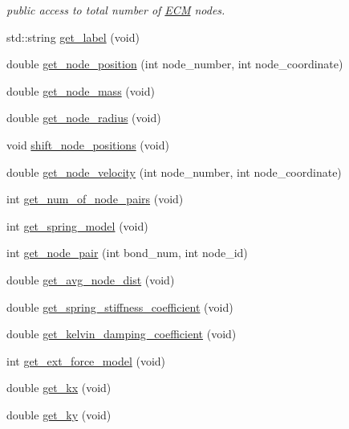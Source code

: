 \begin{DoxyCompactItemize}
\begin{DoxyCompactList}\small\item\em public access to total number of \mbox{\hyperlink{classECM}{E\+CM}} nodes. \end{DoxyCompactList}\item 
std\+::string \mbox{\hyperlink{classActin_aebeb549997f6d414aee3d1661363877e}{get\+\_\+label}} (void)
\item 
double \mbox{\hyperlink{classActin_a833dc614b33e4196ce9202f10e556e36}{get\+\_\+node\+\_\+position}} (int node\+\_\+number, int node\+\_\+coordinate)
\item 
double \mbox{\hyperlink{classActin_a012b67bcc55e02a460dbd4d4b6cd8ea7}{get\+\_\+node\+\_\+mass}} (void)
\item 
double \mbox{\hyperlink{classActin_a4180755ec60e5d39f7399f80270bed1d}{get\+\_\+node\+\_\+radius}} (void)
\item 
void \mbox{\hyperlink{classActin_a87b0ca52480019247fa0075259619458}{shift\+\_\+node\+\_\+positions}} (void)
\item 
double \mbox{\hyperlink{classActin_ad1367a39ec6362c503d5c21b9d96d58b}{get\+\_\+node\+\_\+velocity}} (int node\+\_\+number, int node\+\_\+coordinate)
\item 
int \mbox{\hyperlink{classActin_aab2351fd842efa6127dda490cb1cdbd3}{get\+\_\+num\+\_\+of\+\_\+node\+\_\+pairs}} (void)
\item 
int \mbox{\hyperlink{classActin_adb7a38c592a496135519c58664752ec9}{get\+\_\+spring\+\_\+model}} (void)
\item 
int \mbox{\hyperlink{classActin_abd9b6ba0cc9f5aa8e670c314ae8afa8e}{get\+\_\+node\+\_\+pair}} (int bond\+\_\+num, int node\+\_\+id)
\item 
double \mbox{\hyperlink{classActin_ac003b972790cb2209bacabe7106ecdcb}{get\+\_\+avg\+\_\+node\+\_\+dist}} (void)
\item 
double \mbox{\hyperlink{classActin_abdb4d9b0af05a00dd532e546a69c1371}{get\+\_\+spring\+\_\+stiffness\+\_\+coefficient}} (void)
\item 
double \mbox{\hyperlink{classActin_a5a2d7e5b5f6cc97bedc5fe46bd18e4c8}{get\+\_\+kelvin\+\_\+damping\+\_\+coefficient}} (void)
\item 
int \mbox{\hyperlink{classActin_a5a1b2a81b2b6693425a01394428c1a78}{get\+\_\+ext\+\_\+force\+\_\+model}} (void)
\item 
double \mbox{\hyperlink{classActin_a4f87741b64dc265de0b2cb466164e7ac}{get\+\_\+kx}} (void)
\item 
double \mbox{\hyperlink{classActin_a23b09ce0aaa28c9a7a74a52d9d1d5a93}{get\+\_\+ky}} (void)

\end{DoxyCompactItemize}
